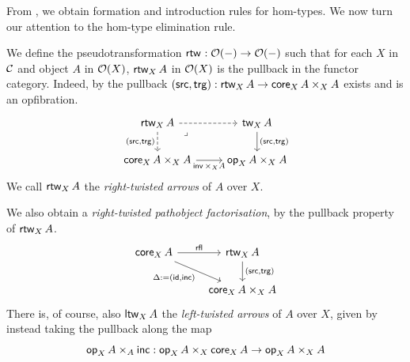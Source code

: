 From ,
we obtain formation and introduction rules for hom-types.
We now turn our attention to the hom-type elimination rule.

\begin{definition}
  We define the pseudotransformation
  $\rtw{} : \opfibcart(-) \to \opfibcart(-)$
  such that for each $X$ in $\CC$
  and object $A$ in $\opfibcart(X)$,
  $\rtw[X]{A}$ in $\opfibcart(X)$
  is the pullback in the functor category.
  Indeed, by 
  the pullback
  $(\src,\trg) : \rtw[X]{A} \to \vCore[X]{A} \times_X A$
  exists and is an opfibration.
  \[
    \begin{tikzcd}
      {\rtw[X]{A}} & {\vTw[X]{A}} \\
      {\vCore[X]{A} \times_X A} & {\vOp[X]{A} \times_X A}
      \arrow[dashed, from=1-1, to=1-2]
      \arrow["{(\src,\trg)}"', dashed, from=1-1, to=2-1]
      \arrow["\lrcorner"{anchor=center, pos=0.125}, draw=none, from=1-1, to=2-2]
      \arrow["{(\src,\trg)}", from=1-2, to=2-2]
      \arrow["{\inv \times_X A}"', from=2-1, to=2-2]
    \end{tikzcd}
  \]
We call $\rtw[X] A$ the \emph{right-twisted arrows} of $A$ over $X$.
\end{definition}
We also obtain a \emph{right-twisted pathobject factorisation},
by the pullback property of $\rtw[X]{A}$.
\[\begin{tikzcd}
	{\vCore[X] A} & {\rtw[X]{A}} \\
	& {\vCore[X]{A} \times_X A}
	\arrow["\rfl", from=1-1, to=1-2]
	\arrow["{\Delta := (\id,\inc)}"', from=1-1, to=2-2]
	\arrow["{(\src,\trg)}", from=1-2, to=2-2]
\end{tikzcd}\]
There is, of course, also $\ltw[X] A$ the \emph{left-twisted arrows} of $A$ over $X$,
given by instead taking the pullback along the map
\[\vOp[X]{A} \times_A \inc : \vOp[X]{A} \times_X \vCore[X] A \to {\vOp[X]{A} \times_X A}\]

